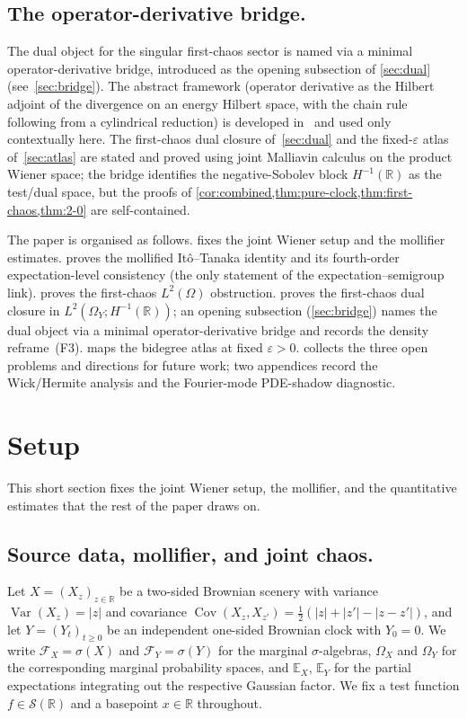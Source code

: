 \documentclass[EJP]{ejpecp}
\newcommand{\R}{\mathbb{R}}
\renewcommand{\E}{\mathbb{E}}
\DeclareMathOperator{\Var}{Var}
\DeclareMathOperator{\Cov}{Cov}
\begin{document}
\subsection*{The operator-derivative bridge.}
The dual object for the singular first-chaos sector is named via a
minimal operator-derivative bridge, introduced as the opening
subsection of \cref{sec:dual} (see~\cref{sec:bridge}). The abstract
framework (operator derivative as the Hilbert adjoint of the
divergence on an energy Hilbert space, with the chain rule
following from a cylindrical reduction) is developed
in~\cite{Fontes-OperatorDerivative} and used only contextually
here. The first-chaos dual closure of~\cref{sec:dual} and the
fixed-$\varepsilon$ atlas of~\cref{sec:atlas} are stated and proved
using joint Malliavin calculus on the product Wiener space; the
bridge identifies the negative-Sobolev block $H^{-1}(\R)$ as the
test/dual space, but the proofs of
\cref{cor:combined,thm:pure-clock,thm:first-chaos,thm:2-0} are
self-contained.

The paper is organised as follows.  fixes the joint
Wiener setup and the mollifier estimates. 
proves the mollified It\^o--Tanaka identity and its fourth-order
expectation-level consistency (the only statement of the
expectation--semigroup link).  proves the
first-chaos $L^{2}(\Omega)$ obstruction.  proves the
first-chaos dual closure in $L^{2}(\Omega_Y;H^{-1}(\R))$; an opening
subsection (\cref{sec:bridge}) names the dual object via a minimal
operator-derivative bridge and records the density reframe~(F3).
 maps the
bidegree atlas at fixed $\varepsilon>0$.  collects
the three open problems and directions for future work; two
appendices record the Wick/Hermite analysis and the Fourier-mode
PDE-shadow diagnostic.

\section{Setup}\label{sec:setup}

This short section fixes the joint Wiener setup, the mollifier, and
the quantitative estimates that the rest of the paper draws on.

\subsection*{Source data, mollifier, and joint chaos.}
Let $X=(X_z)_{z\in\R}$ be a two-sided Brownian scenery with
variance $\Var(X_z)=|z|$ and covariance
$\Cov(X_z,X_{z'})=\tfrac12(|z|+|z'|-|z-z'|)$, and let
$Y=(Y_t)_{t\ge 0}$ be an independent one-sided Brownian clock with
$Y_0=0$. We write $\mathcal F_X=\sigma(X)$ and
$\mathcal F_Y=\sigma(Y)$ for the marginal $\sigma$-algebras,
$\Omega_X$ and $\Omega_Y$ for the corresponding marginal probability
spaces, and $\E_X$, $\E_Y$ for the partial expectations integrating
out the respective Gaussian factor. We fix a test function
$f\in\mathscr S(\R)$ and a basepoint $x\in\R$ throughout.
\end{document}
